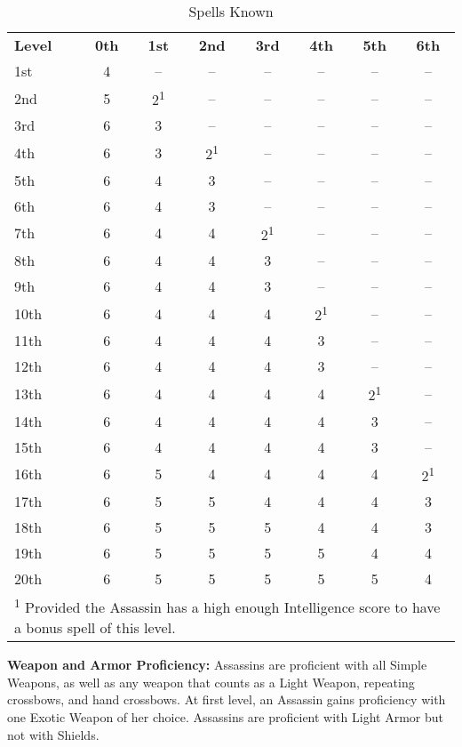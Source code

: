 \begin{wraptable}{O}{8.75cm}
\caption{\currentclassname{} Spells Known}
\begin{tabular}{l*{7}{c}}
\textbf{Level} & \textbf{0th} & \textbf{1st} & \textbf{2nd} & \textbf{3rd} & \textbf{4th} & \textbf{5th} & \textbf{6th} \\
1st & 4 & -- & -- & -- & -- & -- & --\\
2nd & 5 & 2\textsuperscript{1} & -- & -- & -- & -- & --\\
3rd & 6 & 3 & -- & -- & -- & -- & --\\
4th & 6 & 3 & 2\textsuperscript{1} & -- & -- & -- & --\\
5th & 6 & 4 & 3 & -- & -- & -- & --\\
6th & 6 & 4 & 3 & -- & -- & -- & --\\
7th & 6 & 4 & 4 & 2\textsuperscript{1} & -- & -- & --\\
8th & 6 & 4 & 4 & 3 & -- & -- & --\\
9th & 6 & 4 & 4 & 3 & -- & -- & --\\
10th & 6 & 4 & 4 & 4 & 2\textsuperscript{1} & -- & --\\
11th & 6 & 4 & 4 & 4 & 3 & -- & --\\
12th & 6 & 4 & 4 & 4 & 3 & -- & --\\
13th & 6 & 4 & 4 & 4 & 4 & 2\textsuperscript{1} & --\\
14th & 6 & 4 & 4 & 4 & 4 & 3 & --\\
15th & 6 & 4 & 4 & 4 & 4 & 3 & --\\
16th & 6 & 5 & 4 & 4 & 4 & 4 & 2\textsuperscript{1}\\
17th & 6 & 5 & 5 & 4 & 4 & 4 & 3\\
18th & 6 & 5 & 5 & 5 & 4 & 4 & 3\\
19th & 6 & 5 & 5 & 5 & 5 & 4 & 4\\
20th & 6 & 5 & 5 & 5 & 5 & 5 & 4\\
\multicolumn{8}{p{8.5cm}}{\cellcolor{white}\textsuperscript{1} Provided the Assassin has a high enough Intelligence score to have a bonus spell of this level.}\\
\end{tabular}
\end{wraptable}

\classfeatures

\textbf{Weapon and Armor Proficiency:} Assassins are proficient with all Simple Weapons, as well as any weapon that counts as a Light Weapon, repeating crossbows, and hand crossbows. At first level, an Assassin gains proficiency with one Exotic Weapon of her choice. Assassins are proficient with Light Armor but not with Shields.

